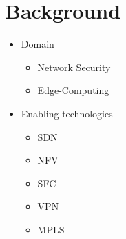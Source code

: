 \chapter{Background}
\label{background}
\iffalse
\begin{itemize}
    \item Domain
    \begin{itemize}
        \item Network Security
        \item Edge-Computing
    \end{itemize}
    \item Enabling technologies
    \begin{itemize}
        \item SDN
        \item NFV
        \item SFC
        \item VPN
        \item MPLS

\end{itemize}
\end{itemize}
